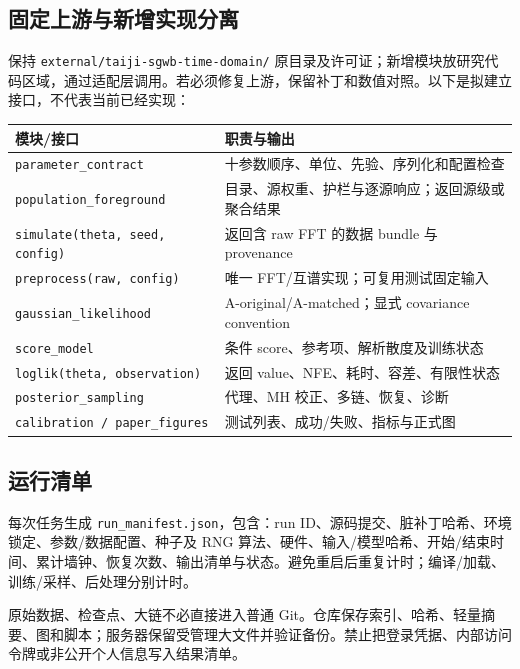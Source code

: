 \documentclass[UTF8,fontset=none,a4paper,11pt]{ctexart}
\begin{document}
\subsection{固定上游与新增实现分离}
保持 \texttt{external/taiji-sgwb-time-domain/} 原目录及许可证；新增模块放研究代码区域，通过适配层调用。若必须修复上游，保留补丁和数值对照。以下是拟建立接口，不代表当前已经实现：
\par\noindent
\begin{tabularx}{\linewidth}{p{48mm}Y}\toprule
模块/接口 & 职责与输出\\\midrule
\texttt{parameter\_contract} & 十参数顺序、单位、先验、序列化和配置检查\\
\texttt{population\_foreground} & 目录、源权重、护栏与逐源响应；返回源级或聚合结果\\
\texttt{simulate(theta, seed, config)} & 返回含 raw FFT 的数据 bundle 与 provenance\\
\texttt{preprocess(raw, config)} & 唯一 FFT/互谱实现；可复用测试固定输入\\
\texttt{gaussian\_likelihood} & A-original/A-matched；显式 covariance convention\\
\texttt{score\_model} & 条件 score、参考项、解析散度及训练状态\\
\texttt{loglik(theta, observation)} & 返回 value、NFE、耗时、容差、有限性状态\\
\texttt{posterior\_sampling} & 代理、MH 校正、多链、恢复、诊断\\
\texttt{calibration / paper\_figures} & 测试列表、成功/失败、指标与正式图\\\bottomrule
\end{tabularx}
\subsection{运行清单}
每次任务生成 \texttt{run\_manifest.json}，包含：run ID、源码提交、脏补丁哈希、环境锁定、参数/数据配置、种子及 RNG 算法、硬件、输入/模型哈希、开始/结束时间、累计墙钟、恢复次数、输出清单与状态。避免重启后重复计时；编译/加载、训练/采样、后处理分别计时。
\par 原始数据、检查点、大链不必直接进入普通 Git。仓库保存索引、哈希、轻量摘要、图和脚本；服务器保留受管理大文件并验证备份。禁止把登录凭据、内部访问令牌或非公开个人信息写入结果清单。
\end{document}
